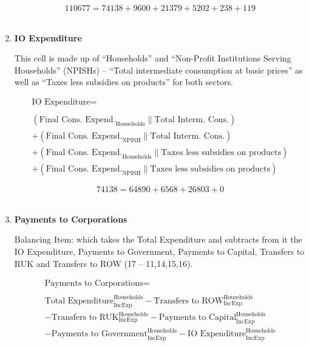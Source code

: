 \begin{enumerate}
\begin{equation} \nonumber
110677 = 74138+9600+21379+5202+238+119
\end{equation}\\


\item \textbf {IO Expenditure}

This cell is made up of “Households” and “Non-Profit Institutions Serving Households” (NPISHs) – “Total intermediate consumption at basic prices” as well as “Taxes less subsidies on products” for both sectors. \cite{ScotGov2013a}

\begin{equation}
\begin{split}
\text{IO Expenditure} =  \\ \\
(\text{Final Cons. Expend.}_\text{Households}\|\text{Total Interm. Cons.})\\
+(\text{Final Cons. Expend.}_\text{NPISH}\|\text{Total Interm. Cons.})\\
+(\text{Final Cons. Expend.}_\text{Households}\|\text{Taxes less subsidies on products})\\
+(\text{Final Cons. Expend.}_\text{NPISH}\|\text{Taxes less subsidies on products})
\end{split} \label{eq:2.5.15}
\end{equation}

\begin{equation} \nonumber
74138 = 64890+6568+26803+0
\end{equation}\\


\item \textbf {Payments to Corporations}

Balancing Item: which takes the Total Expenditure and subtracts from it the IO Expenditure, Payments to Government, Payments to Capital, Transfers to RUK and Transfers to ROW (17 – 11,14,15,16).

\begin{equation}
\begin{split}
\text{Payments to Corporations} =  \\ \\
\text{Total Expenditure}^\text{Households}_\text{IncExp}-\text{Transfers to ROW}^\text{Households}_\text{IncExp}\\
-\text{Transfers to RUK}^\text{Households}_\text{IncExp}-\text{Payments to Capital}^\text{Households}_\text{IncExp}\\
-\text{Payments to Government}^\text{Households}_\text{IncExp}-\text{IO Expenditure}^\text{Households}_\text{IncExp}
\end{split} \label{eq:2.5.16}
\end{equation}


\end{enumerate}
